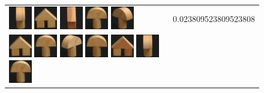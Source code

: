 \begin{figure}[tbp]
\begin{center}
\begin{tabular}{m{11cm} | m{3cm} |}
\includegraphics[width=1cm]{coil/beeld-2.eps}
\includegraphics[width=1cm]{coil/beeld-42.eps}
\includegraphics[width=1cm]{coil/beeld-44.eps}
\includegraphics[width=1cm]{coil/beeld-0.eps}
\includegraphics[width=1cm]{coil/beeld-4.eps}
& {\scriptsize 0.023809523809523808}
\\
\includegraphics[width=1cm]{coil/beeld-42.eps}
\includegraphics[width=1cm]{coil/beeld-0.eps}
\includegraphics[width=1cm]{coil/beeld-3.eps}
\includegraphics[width=1cm]{coil/beeld-1.eps}
\includegraphics[width=1cm]{coil/beeld-43.eps}
\includegraphics[width=1cm]{coil/beeld-2.eps}
\includegraphics[width=1cm]{coil/beeld-0.eps}

\end{tabular}
\end{center}
\end{figure}

